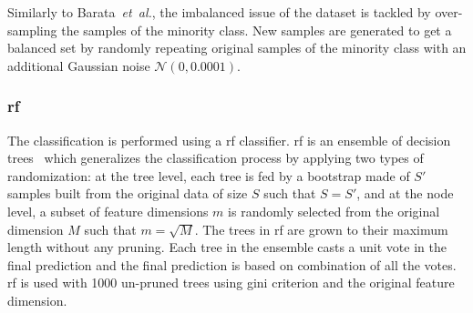 Similarly to Barata~\emph{et~al.}\cite{barata2013two}, the imbalanced issue of the dataset is tackled by over-sampling the samples of the minority class.
New samples are generated to get a balanced set by randomly repeating original samples of the minority class with an additional Gaussian noise $\mathcal{N}(0, 0.0001)$.

\subsubsection{\acf*{rf}}

The classification is performed using a \ac{rf} classifier.
\Ac{rf} is an ensemble of decision trees~\cite{breiman2001random} which generalizes the classification process by applying two types of randomization: at the tree level, each tree is fed by a bootstrap made of $S'$ samples built from the original data of size $S$ such that  $S=S'$, and at the node level, a subset of feature dimensions $m$ is randomly selected from the original dimension $M$ such that $m=\sqrt{M}$. 
The trees in \ac{rf} are grown to their maximum length without any pruning.
Each tree in the ensemble casts a unit vote in the final prediction and the final prediction is based on combination of all the votes. 
\Ac{rf} is used with 1000 un-pruned trees using gini criterion and the original feature dimension.





